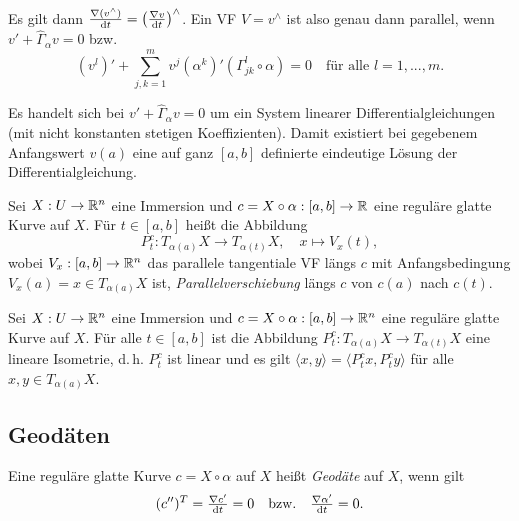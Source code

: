 \documentclass{cheat-sheet}
\begin{document}
\begin{satz}
  Es gilt dann $\tfrac{\nabla (v^\wedge)}{\mathrm{d} t} = \left( \tfrac{\nabla v}{\mathrm{d} t} \right)^\wedge$. Ein VF $V = v^\wedge$ ist also genau dann parallel, wenn $v' + \hat{\Gamma}_\alpha v = 0$ bzw.
  \[ (v^l)' + \sum_{j,k=1}^m v^j (\alpha^k)' (\Gamma_{jk}^l \circ \alpha) = 0 \quad \text{für alle $l = 1, ..., m$.} \]
\end{satz}

\begin{bem}
  Es handelt sich bei $v' + \hat{\Gamma}_\alpha v = 0$ um ein System linearer Differentialgleichungen (mit nicht konstanten stetigen Koeffizienten). Damit existiert bei gegebenem Anfangswert $v(a)$ eine auf ganz $[a, b]$ definierte eindeutige Lösung der Differentialgleichung.
\end{bem}

\begin{defn}
  Sei $X : U \to \mathbb{R}^n$ eine Immersion und $c = X \circ \alpha : [a, b] \to \mathbb{R}$ eine reguläre glatte Kurve auf $X$. Für $t \in [a, b]$ heißt die Abbildung
  \[ P_t^c : T_{\alpha(a)} X \to T_{\alpha(t)} X, \quad x \mapsto V_x(t), \]
  wobei $V_x : [a, b] \to \mathbb{R}^n$ das parallele tangentiale VF längs $c$ mit Anfangsbedingung $V_x(a) = x \in T_{\alpha(a)} X$ ist, \emph{Parallelverschiebung} längs $c$ von $c(a)$ nach $c(t)$.
\end{defn}

\begin{samepage}

\begin{satz}
  Sei $X : U \to \mathbb{R}^n$ eine Immersion und $c = X \circ \alpha : [a, b] \to \mathbb{R}^n$ eine reguläre glatte Kurve auf $X$. Für alle $t \in [a, b]$ ist die Abbildung $P_t^c : T_{\alpha(a)} X \to T_{\alpha(t)} X$ eine lineare Isometrie, d.\,h. $P_t^c$ ist linear und es gilt $\langle x, y \rangle = \langle P_t^c x, P_t^c y \rangle$ für alle $x, y \in T_{\alpha(a)} X$.
\end{satz}


\subsection{Geodäten}

\end{samepage}

\begin{defn}
  Eine reguläre glatte Kurve $c = X \circ \alpha$ auf $X$ heißt \emph{Geodäte} auf $X$, wenn gilt
  \[ (c'')^T = \tfrac{\nabla c'}{\mathrm{d} t} = 0 \quad\text{bzw.}\quad \tfrac{\nabla \alpha'}{\mathrm{d} t} = 0. \]
\end{defn}
\end{document}
